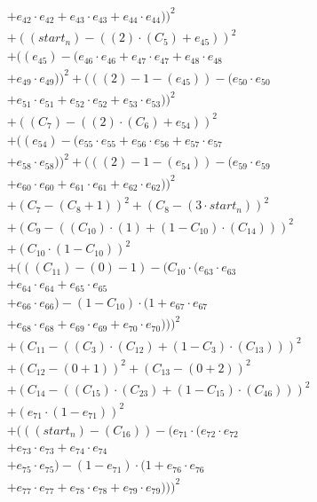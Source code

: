\documentclass[10pt, a4paper]{article}
\begin{document}
\begin{align*}
& + e_{42} \cdot e_{42} + e_{43} \cdot e_{43} + e_{44} \cdot e_{44}))^{2} \\
& + ((start_n) - ((2)  \cdot  (C_{5}) + e_{45}))^{2} \\
& + ((e_{45}) - (e_{46} \cdot e_{46} + e_{47} \cdot e_{47} + e_{48} \cdot e_{48} \\
& + e_{49} \cdot e_{49}))^{2} + (((2) - 1 - (e_{45})) - (e_{50} \cdot e_{50} \\
& + e_{51} \cdot e_{51} + e_{52} \cdot e_{52} + e_{53} \cdot e_{53}))^{2} \\
& + ((C_{7}) - ((2)  \cdot  (C_{6}) + e_{54}))^{2} \\
& + ((e_{54}) - (e_{55} \cdot e_{55} + e_{56} \cdot e_{56} + e_{57} \cdot e_{57} \\
& + e_{58} \cdot e_{58}))^{2} + (((2) - 1 - (e_{54})) - (e_{59} \cdot e_{59} \\
& + e_{60} \cdot e_{60} + e_{61} \cdot e_{61} + e_{62} \cdot e_{62}))^{2} \\
& + (C_{7} - (C_{8} + 1))^{2} + (C_{8} - (3  \cdot  start_n))^{2} \\
& + (C_{9} - ((C_{10})  \cdot  (1) + (1 - C_{10})  \cdot  (C_{14})))^{2} \\
& + (C_{10} \cdot (1 - C_{10}))^{2} \\
& + (((C_{11}) - (0) - 1) - (C_{10} \cdot (e_{63} \cdot e_{63} \\
& + e_{64} \cdot e_{64} + e_{65} \cdot e_{65} \\
& + e_{66} \cdot e_{66}) - (1 - C_{10}) \cdot (1 + e_{67} \cdot e_{67} \\
& + e_{68} \cdot e_{68} + e_{69} \cdot e_{69} + e_{70} \cdot e_{70})))^{2} \\
& + (C_{11} - ((C_{3})  \cdot  (C_{12}) + (1 - C_{3})  \cdot  (C_{13})))^{2} \\
& + (C_{12} - (0 + 1))^{2} + (C_{13} - (0 + 2))^{2} \\
& + (C_{14} - ((C_{15})  \cdot  (C_{23}) + (1 - C_{15})  \cdot  (C_{46})))^{2} \\
& + (e_{71} \cdot (1 - e_{71}))^{2} \\
& + (((start_n) - (C_{16})) - (e_{71} \cdot (e_{72} \cdot e_{72} \\
& + e_{73} \cdot e_{73} + e_{74} \cdot e_{74} \\
& + e_{75} \cdot e_{75}) - (1 - e_{71}) \cdot (1 + e_{76} \cdot e_{76} \\
& + e_{77} \cdot e_{77} + e_{78} \cdot e_{78} + e_{79} \cdot e_{79})))^{2} \\

\end{align*}
\end{document}
